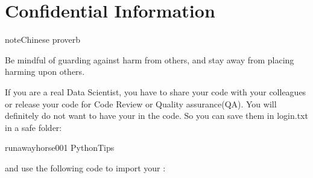 \documentclass[letterpaper,12pt,english]{sphinxmanual}
\begin{document}
\begin{figure}[htbp]
\centering

\noindent{}
\end{figure}


\chapter{Confidential Information}
\label{\detokenize{confi:confidential-information}}\label{\detokenize{confi:confi}}\label{\detokenize{confi::doc}}
\begin{sphinxadmonition}{note}{Chinese proverb}

Be mindful of guarding against harm from others, and stay away from placing harming upon others.
\end{sphinxadmonition}

If you are a real Data Scientist, you have to share your code with your colleagues or release your code for Code Review or Quality assurance(QA). You will definitely do not want to have your  in the code. So you can save them in login.txt in a safe folder:

\begin{sphinxVerbatim}[commandchars=\\\{\}]
runawayhorse001
PythonTips
\end{sphinxVerbatim}

and use the following code to import your :

\begin{sphinxVerbatim}[commandchars=\\\{\}]
       
      \PYG{p}{[}\PYG{p}{]}\PYG{p}{[}\PYG{p}{]}
      \PYG{p}{[}\PYG{p}{]}\PYG{p}{[}\PYG{p}{]}
\end{sphinxVerbatim}
\end{document}
